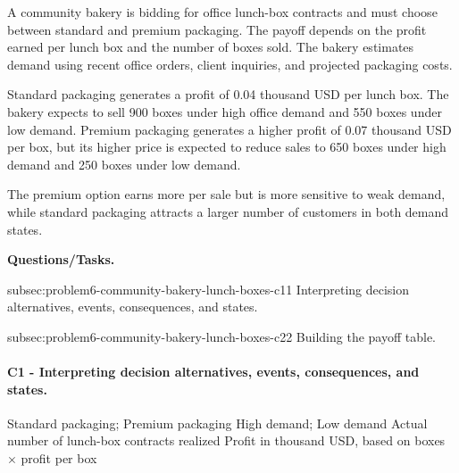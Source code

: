 	A community bakery is bidding for office lunch-box contracts and must choose between standard and premium packaging. The payoff depends on the profit earned per lunch box and the number of boxes sold. The bakery estimates demand using recent office orders, client inquiries, and projected packaging costs.
	
	Standard packaging generates a profit of 0.04 thousand USD per lunch box. The bakery expects to sell 900 boxes under high office demand and 550 boxes under low demand. Premium packaging generates a higher profit of 0.07 thousand USD per box, but its higher price is expected to reduce sales to 650 boxes under high demand and 250 boxes under low demand.
	
	The premium option earns more per sale but is more sensitive to weak demand, while standard packaging attracts a larger number of customers in both demand states.

	\textbf{Questions/Tasks.}
	\begin{enumerate}
		\CriterionTask
		{subsec:problem6-community-bakery-lunch-boxes-c1}{1}
		{Interpreting decision alternatives, events, consequences, and states.}

		\CriterionTask
		{subsec:problem6-community-bakery-lunch-boxes-c2}{2}
		{Building the payoff table.}
	\end{enumerate}

\paragraph*{C1 - Interpreting decision alternatives, events, consequences, and states.}
	\label{subsec:problem6-community-bakery-lunch-boxes-c1}
	\DecisionElementsTable
	{Standard packaging; Premium packaging}
	{High demand; Low demand}
	{Actual number of lunch-box contracts realized}
	{Profit in thousand USD, based on boxes $\times$ profit per box}


